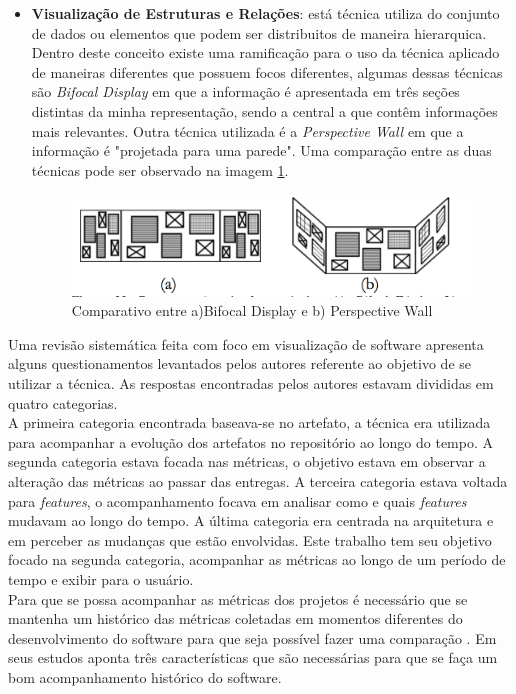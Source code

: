 \begin{itemize}
\item \textbf{Visualização de Estruturas e Relações}: está técnica utiliza do conjunto de dados ou elementos que podem ser distribuitos de maneira hierarquica. Dentro deste conceito existe uma ramificação para o uso da técnica aplicado de maneiras diferentes que possuem focos diferentes, algumas dessas técnicas são \textit{Bifocal Display} em que a informação é apresentada em três seções distintas da minha representação, sendo a central a que contêm informações mais relevantes. Outra técnica utilizada é a \textit{Perspective Wall} em que a informação é "projetada para uma parede". Uma comparação entre as duas técnicas pode ser observado na imagem \ref{img:comparativo}.
\graphicspath{{figuras/}}
\begin{figure}[h]
\centering
\includegraphics[scale=0.5]{Bifocal_Wall}
\caption{Comparativo entre a)Bifocal Display e b) Perspective Wall}
\label{img:comparativo}
\end{figure}
%
\end{itemize}
Uma revisão sistemática feita com foco em visualização de software \cite{salameh_software_2016} apresenta alguns questionamentos levantados pelos autores referente ao objetivo de se utilizar a técnica. As respostas encontradas pelos autores estavam divididas em quatro categorias. 
\\A primeira categoria encontrada baseava-se no artefato, a técnica era utilizada para acompanhar a evolução dos artefatos no repositório ao longo do tempo. A segunda categoria estava focada nas métricas, o objetivo estava em observar a alteração das métricas ao passar das entregas. A terceira categoria estava voltada para \textit{features}, o acompanhamento focava em analisar como e quais \textit{features} mudavam ao longo do tempo. A última categoria era centrada na arquitetura e em perceber as mudanças que estão envolvidas. Este trabalho tem seu objetivo focado na segunda categoria, acompanhar as métricas ao longo de um período de tempo e exibir para o usuário.
\\Para que se possa acompanhar as métricas dos projetos é necessário que se mantenha um histórico das métricas coletadas em momentos diferentes do desenvolvimento do software para que seja possível fazer uma comparação \cite{da_silva_iavems:_2010}. Em seus estudos \cite{gracanin_software_2005} aponta três características que são necessárias para que se faça um bom acompanhamento histórico do software.
